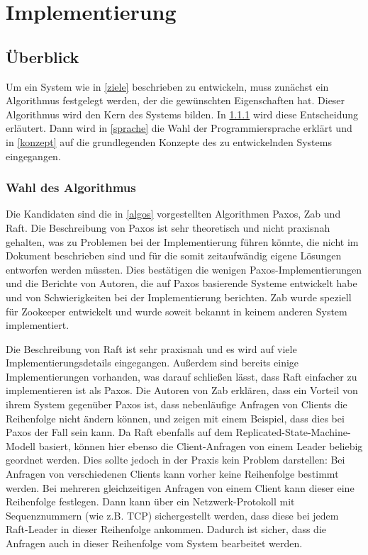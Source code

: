 \chapter{Implementierung}
\label{impl}

\section{Überblick}

Um ein System wie in \ref{ziele} beschrieben zu entwickeln, muss zunächst ein Algorithmus festgelegt werden, der die gewünschten Eigenschaften hat. Dieser Algorithmus wird den Kern des Systems bilden. In \ref{algo} wird diese Entscheidung erläutert. Dann wird in \ref{sprache} die Wahl der Programmiersprache erklärt und in \ref{konzept} auf die grundlegenden Konzepte des zu entwickelnden Systems eingegangen.

\subsection{Wahl des Algorithmus}
\label{algo}

Die Kandidaten sind die in \ref{algos} vorgestellten Algorithmen Paxos, Zab und Raft. Die Beschreibung von Paxos ist sehr theoretisch und nicht praxisnah gehalten, was zu Problemen bei der Implementierung führen könnte, die nicht im Dokument beschrieben sind und für die somit zeitaufwändig eigene Lösungen entworfen werden müssten. Dies bestätigen die wenigen Paxos-Implementierungen und die Berichte von Autoren, die auf Paxos basierende Systeme entwickelt habe und von Schwierigkeiten bei der Implementierung berichten. Zab wurde speziell für Zookeeper entwickelt und wurde soweit bekannt in keinem anderen System implementiert. 

Die Beschreibung von Raft ist sehr praxisnah und es wird auf viele Implementierungsdetails eingegangen. Außerdem sind bereits einige Implementierungen vorhanden, was darauf schließen lässt, dass Raft einfacher zu implementieren ist als Paxos. Die Autoren von Zab erklären, dass ein Vorteil von ihrem System gegenüber Paxos ist, dass nebenläufige Anfragen von Clients die Reihenfolge nicht ändern können, und zeigen mit einem Beispiel, dass dies bei Paxos der Fall sein kann. Da Raft ebenfalls auf dem Replicated-State-Machine-Modell basiert, können hier ebenso die Client-Anfragen von einem Leader beliebig geordnet werden. Dies sollte jedoch in der Praxis kein Problem darstellen: Bei Anfragen von verschiedenen Clients kann vorher keine Reihenfolge bestimmt werden. Bei mehreren gleichzeitigen Anfragen von einem Client kann dieser eine Reihenfolge festlegen. Dann kann über ein Netzwerk-Protokoll mit Sequenznummern (wie z.B. TCP) sichergestellt werden, dass diese bei jedem Raft-Leader in dieser Reihenfolge ankommen. Dadurch ist sicher, dass die Anfragen auch in dieser Reihenfolge vom System bearbeitet werden.
 

